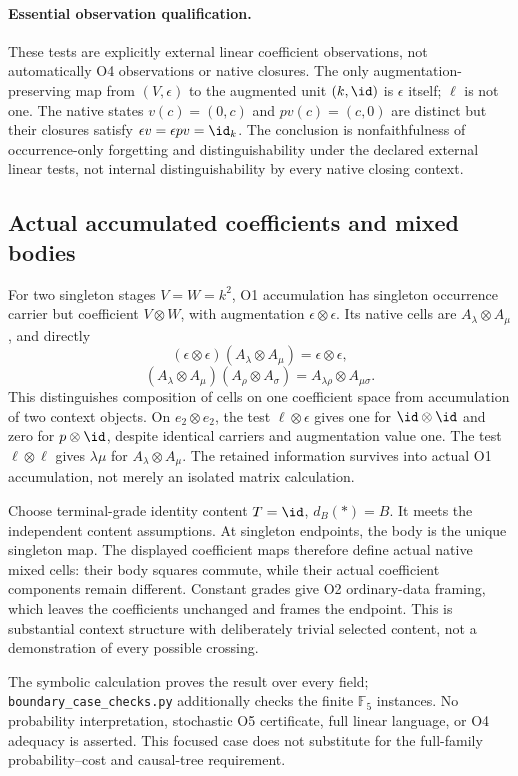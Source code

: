 \paragraph{Essential observation qualification.}
These tests are explicitly external linear coefficient observations,
not automatically O4 observations or native closures. The only
augmentation-preserving map from $(V,\epsilon)$ to the augmented unit
$(k,\id)$ is $\epsilon$ itself; $\ell$ is not one. The native states
$v(c)=(0,c)$ and $pv(c)=(c,0)$ are distinct but their closures satisfy
$\epsilon v=\epsilon pv=\id_k$. The conclusion is nonfaithfulness of
occurrence-only forgetting and distinguishability under the declared
external linear tests, not internal distinguishability by every native
closing context.

\subsection{Actual accumulated coefficients and mixed bodies}
For two singleton stages $V=W=k^2$, O1 accumulation has singleton
occurrence carrier but coefficient $V\otimes W$, with augmentation
$\epsilon\otimes\epsilon$. Its native cells are
$A_\lambda\otimes A_\mu$, and directly
\[
(\epsilon\otimes\epsilon)(A_\lambda\otimes A_\mu)
 =\epsilon\otimes\epsilon,
\]
\[
(A_\lambda\otimes A_\mu)(A_\rho\otimes A_\sigma)
 =A_{\lambda\rho}\otimes A_{\mu\sigma}.
\]
This distinguishes composition of cells on one coefficient space from
accumulation of two context objects. On $e_2\otimes e_2$, the test
$\ell\otimes\epsilon$ gives one for $\id\otimes\id$ and zero for
$p\otimes\id$, despite identical carriers and augmentation value one.
The test $\ell\otimes\ell$ gives $\lambda\mu$ for
$A_\lambda\otimes A_\mu$. The retained information survives into
actual O1 accumulation, not merely an isolated matrix calculation.

Choose terminal-grade identity content $T=\id$, $d_B(*)=B$.
It meets the independent content assumptions. At singleton endpoints,
the body is the unique singleton map. The displayed coefficient maps
therefore define actual native mixed cells: their body squares commute,
while their actual coefficient components remain different. Constant
grades give O2 ordinary-data framing, which leaves the coefficients
unchanged and frames the endpoint. This is substantial context structure
with deliberately trivial selected content, not a demonstration of every
possible crossing.

The symbolic calculation proves the result over every field;
\texttt{boundary\_case\_checks.py} additionally checks the finite
$\mathbb F_5$ instances. No probability interpretation, stochastic O5
certificate, full linear language, or O4 adequacy is asserted. This
focused case does not substitute for the full-family probability--cost
and causal-tree requirement.

